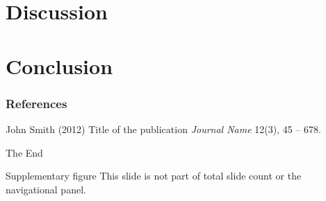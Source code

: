 \documentclass{beamer}
\begin{document}
\section{Discussion}

\section{Conclusion}

\begin{frame}
\frametitle{References}
\footnotesize{
\begin{thebibliography}{99} %
 John Smith (2012)
\newblock Title of the publication
\newblock \emph{Journal Name} 12(3), 45 -- 678.
\end{thebibliography}
}
\end{frame}


\begin{frame}
\Huge{\centerline{The End}}
\end{frame}

\appendix

\begin{frame}{Supplementary figure}
This slide is not part of total slide count or the navigational panel.
\begin{figure}
    \centering
\end{figure}
\end{frame}

\end{document}
